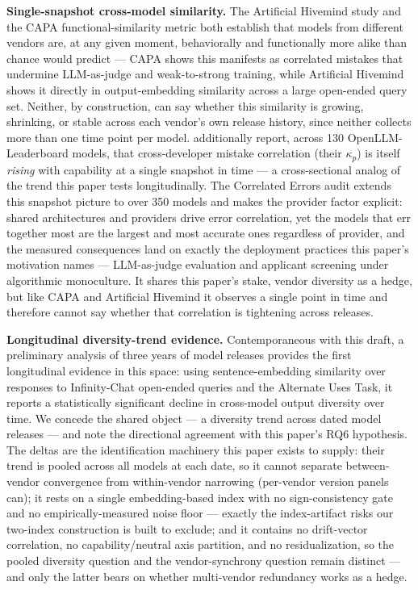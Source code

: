 \documentclass[11pt]{article}
\begin{document}
\textbf{Single-snapshot cross-model similarity.} The Artificial Hivemind study \citep{ArtificialHivemind} and the CAPA functional-similarity metric \citep{GreatModelsThinkAlike} both establish that models from different vendors are, at any given moment, behaviorally and functionally more alike than chance would predict --- CAPA shows this manifests as correlated mistakes that undermine LLM-as-judge and weak-to-strong training, while Artificial Hivemind shows it directly in output-embedding similarity across a large open-ended query set. Neither, by construction, can say whether this similarity is growing, shrinking, or stable across each vendor's own release history, since neither collects more than one time point per model. \citet{GreatModelsThinkAlike} additionally report, across 130 OpenLLM-Leaderboard models, that cross-developer mistake correlation (their $\kappa_p$) is itself \emph{rising} with capability at a single snapshot in time --- a cross-sectional analog of the trend this paper tests longitudinally. The Correlated Errors audit \citep{CorrelatedErrors2506} extends this snapshot picture to over 350 models and makes the provider factor explicit: shared architectures and providers drive error correlation, yet the models that err together most are the largest and most accurate ones regardless of provider, and the measured consequences land on exactly the deployment practices this paper's motivation names --- LLM-as-judge evaluation and applicant screening under algorithmic monoculture. It shares this paper's stake, vendor diversity as a hedge, but like CAPA and Artificial Hivemind it observes a single point in time and therefore cannot say whether that correlation is tightening across releases.

\textbf{Longitudinal diversity-trend evidence.} Contemporaneous with this draft, a preliminary analysis of three years of model releases \citep{SimilarlyCreative2608} provides the first longitudinal evidence in this space: using sentence-embedding similarity over responses to Infinity-Chat open-ended queries and the Alternate Uses Task, it reports a statistically significant decline in cross-model output diversity over time. We concede the shared object --- a diversity trend across dated model releases --- and note the directional agreement with this paper's RQ6 hypothesis. The deltas are the identification machinery this paper exists to supply: their trend is pooled across all models at each date, so it cannot separate between-vendor convergence from within-vendor narrowing (per-vendor version panels can); it rests on a single embedding-based index with no sign-consistency gate and no empirically-measured noise floor --- exactly the index-artifact risks our two-index construction is built to exclude; and it contains no drift-vector correlation, no capability/neutral axis partition, and no residualization, so the pooled diversity question and the vendor-synchrony question remain distinct --- and only the latter bears on whether multi-vendor redundancy works as a hedge.
\end{document}
